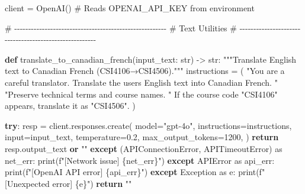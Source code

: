 \documentclass[
  letterpaper,
  DIV=11,
  numbers=noendperiod]{scrartcl}
\newenvironment{Shaded}{\begin{snugshade}}{\end{snugshade}}
\newcommand{\BuiltInTok}[1]{\textcolor[rgb]{0.00,0.23,0.31}{#1}}
\newcommand{\CommentTok}[1]{\textcolor[rgb]{0.37,0.37,0.37}{#1}}
\newcommand{\ControlFlowTok}[1]{\textcolor[rgb]{0.00,0.23,0.31}{\textbf{#1}}}
\newcommand{\DecValTok}[1]{\textcolor[rgb]{0.68,0.00,0.00}{#1}}
\newcommand{\FloatTok}[1]{\textcolor[rgb]{0.68,0.00,0.00}{#1}}
\newcommand{\ImportTok}[1]{\textcolor[rgb]{0.00,0.46,0.62}{#1}}
\newcommand{\KeywordTok}[1]{\textcolor[rgb]{0.00,0.23,0.31}{\textbf{#1}}}
\newcommand{\NormalTok}[1]{\textcolor[rgb]{0.00,0.23,0.31}{#1}}
\newcommand{\OperatorTok}[1]{\textcolor[rgb]{0.37,0.37,0.37}{#1}}
\newcommand{\PreprocessorTok}[1]{\textcolor[rgb]{0.68,0.00,0.00}{#1}}
\newcommand{\SpecialCharTok}[1]{\textcolor[rgb]{0.37,0.37,0.37}{#1}}
\newcommand{\SpecialStringTok}[1]{\textcolor[rgb]{0.13,0.47,0.30}{#1}}
\newcommand{\StringTok}[1]{\textcolor[rgb]{0.13,0.47,0.30}{#1}}
\begin{document}
\begin{Shaded}
\begin{Highlighting}[]
\NormalTok{client }\OperatorTok{=}\NormalTok{ OpenAI()  }\CommentTok{\# Reads OPENAI\_API\_KEY from environment}

\CommentTok{\# {-}{-}{-}{-}{-}{-}{-}{-}{-}{-}{-}{-}{-}{-}{-}{-}{-}{-}{-}{-}{-}{-}{-}{-}{-}{-}{-}{-}{-}{-}{-}{-}{-}{-}{-}{-}{-}{-}{-}{-}{-}{-}{-}{-}{-}{-}{-}{-}{-}{-}{-}{-}{-}{-}{-}}
\CommentTok{\# Text Utilities}
\CommentTok{\# {-}{-}{-}{-}{-}{-}{-}{-}{-}{-}{-}{-}{-}{-}{-}{-}{-}{-}{-}{-}{-}{-}{-}{-}{-}{-}{-}{-}{-}{-}{-}{-}{-}{-}{-}{-}{-}{-}{-}{-}{-}{-}{-}{-}{-}{-}{-}{-}{-}{-}{-}{-}{-}{-}{-}}

\KeywordTok{def}\NormalTok{ translate\_to\_canadian\_french(input\_text: }\BuiltInTok{str}\NormalTok{) }\OperatorTok{{-}\textgreater{}} \BuiltInTok{str}\NormalTok{:}
    \CommentTok{"""Translate English text to Canadian French (CSI4106→CSI4506)."""}
\NormalTok{    instructions }\OperatorTok{=}\NormalTok{ (}
        \StringTok{"You are a careful translator. Translate the user\textquotesingle{}s English text into Canadian French. "}
        \StringTok{"Preserve technical terms and course names. "}
        \StringTok{\textquotesingle{}If the course code "CSI4106" appears, translate it as "CSI4506".\textquotesingle{}}
\NormalTok{    )}

    \ControlFlowTok{try}\NormalTok{:}
\NormalTok{        resp }\OperatorTok{=}\NormalTok{ client.responses.create(}
\NormalTok{            model}\OperatorTok{=}\StringTok{"gpt{-}4o"}\NormalTok{,}
\NormalTok{            instructions}\OperatorTok{=}\NormalTok{instructions,}
            \BuiltInTok{input}\OperatorTok{=}\NormalTok{input\_text,}
\NormalTok{            temperature}\OperatorTok{=}\FloatTok{0.2}\NormalTok{,}
\NormalTok{            max\_output\_tokens}\OperatorTok{=}\DecValTok{1200}\NormalTok{,}
\NormalTok{        )}
        \ControlFlowTok{return}\NormalTok{ resp.output\_text }\KeywordTok{or} \StringTok{""}
    \ControlFlowTok{except}\NormalTok{ (APIConnectionError, APITimeoutError) }\ImportTok{as}\NormalTok{ net\_err:}
        \BuiltInTok{print}\NormalTok{(}\SpecialStringTok{f"[Network issue] }\SpecialCharTok{\{}\NormalTok{net\_err}\SpecialCharTok{\}}\SpecialStringTok{"}\NormalTok{)}
    \ControlFlowTok{except}\NormalTok{ APIError }\ImportTok{as}\NormalTok{ api\_err:}
        \BuiltInTok{print}\NormalTok{(}\SpecialStringTok{f"[OpenAI API error] }\SpecialCharTok{\{}\NormalTok{api\_err}\SpecialCharTok{\}}\SpecialStringTok{"}\NormalTok{)}
    \ControlFlowTok{except} \PreprocessorTok{Exception} \ImportTok{as}\NormalTok{ e:}
        \BuiltInTok{print}\NormalTok{(}\SpecialStringTok{f"[Unexpected error] }\SpecialCharTok{\{}\NormalTok{e}\SpecialCharTok{\}}\SpecialStringTok{"}\NormalTok{)}
    \ControlFlowTok{return} \StringTok{""}


\end{Highlighting}
\end{Shaded}
\end{document}

